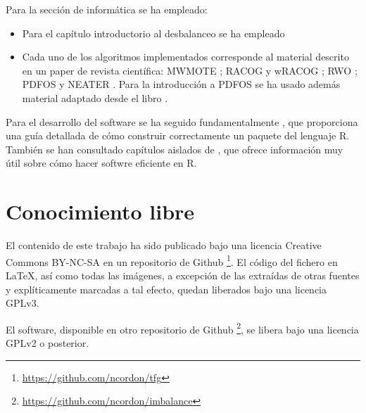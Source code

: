    Para la sección de informática se ha empleado:
   
  \begin{itemize}
   \item Para el capítulo introductorio al desbalanceo se ha empleado \citep{he2009} 
   \item Cada uno de los algoritmos implementados corresponde al material descrito en un paper de revista científica: 
   MWMOTE \citep{barua14}; RACOG y wRACOG \citep{das2015}; RWO \citep{zhang2014}; PDFOS \citep{gao2014} y 
   NEATER \citep{almogahed2014}. Para la introducción a PDFOS se ha usado además material adaptado desde el libro \citep{silverman}.
  \end{itemize}

   Para el desarrollo del software se ha seguido fundamentalmente \citep{rhadleypkg}, que proporciona una guía detallada de
   cómo construir correctamente un paquete del lenguaje R. También se han consultado capítulos aislados de \citep{rgillespie},
   que ofrece información muy útil sobre cómo hacer softwre eficiente en R.
   
  \section{Conocimiento libre}
   El contenido de este trabajo ha sido publicado bajo una licencia Creative Commons BY-NC-SA en un repositorio de Github 
   \footnote{\url{https://github.com/ncordon/tfg}}. El código del fichero en \LaTeX, así como todas las imágenes, a excepción
   de las extraídas de otras fuentes y explíticamente marcadas a tal efecto, quedan liberados bajo una licencia GPLv3.
   
   El software, disponible en otro repositorio de Github \footnote{\url{https://github.com/ncordon/imbalance}}, se libera bajo
   una licencia GPLv2 o posterior.